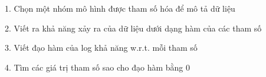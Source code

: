 \documentclass{article}
\begin{document}
\begin{huge}
1. Chọn một nhóm mô hình được tham số hóa để mô tả dữ liệu\\

2. Viết ra khả năng xảy ra của dữ liệu dưới dạng hàm của các tham số\\

3. Viết đạo hàm của log khả năng w.r.t. mỗi tham số

4. Tìm các giá trị tham số sao cho đạo hàm bằng 0\\



\end{huge}
\end{document}

